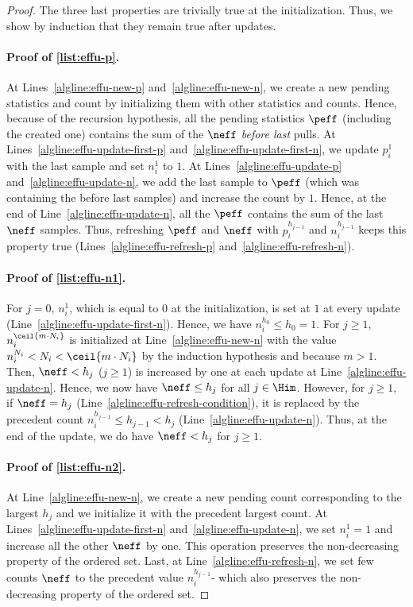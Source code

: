 \begin{proof}
The three last properties are trivially true at the initialization. Thus, we show by induction that they remain true after updates.
\paragraph{Proof of \ref{list:effu-p}. } At Lines~\ref{algline:effu-new-p} and~\ref{algline:effu-new-n}, we create a new pending statistics and count by initializing them with other statistics and counts. Hence, because of the recursion hypothesis, all the pending statistics $\peff$ (including the created one) contains the sum of the $\neff$ \emph{before last} pulls. At Lines~\ref{algline:effu-update-first-p} and~\ref{algline:effu-update-first-n}, we update $p_i^1$ with the last sample and set $n_i^1$ to $1$. At Lines~\ref{algline:effu-update-p} and~\ref{algline:effu-update-n}, we add the last sample to $\peff$ (which was containing the before last samples) and increase the count by $1$. Hence, at the end of Line~\ref{algline:effu-update-n}, all the $\peff$ contains the sum of the last $\neff$ samples. Thus, refreshing $\peff$ and $\neff$ with $ p_i^{h_{j-1}}$ and $n_i^{h_{j-1}}$ keeps this property true (Lines~\ref{algline:effu-refresh-p} and~\ref{algline:effu-refresh-n}). 

\paragraph{Proof of \ref{list:effu-n1}.}
For $j=0$, $n_i^1$, which is equal to $0$ at the initialization, is set at $1$ at every update (Line~\ref{algline:effu-update-first-n}). Hence, we have $n_i^{h_0} \leq h_0=1$.
For $j\geq 1$, $n_i^{\ceil{m \cdot N_i}}$ is initialized at Line~\ref{algline:effu-new-n} with the value $n_i^{N_i} < N_i < \ceil{m \cdot N_i}$ by the induction hypothesis and because $m>1$.  Then, $\neff < h_j$ ($j\geq1$) is increased by one at each update at Line~\ref{algline:effu-update-n}. Hence, we now have $\neff \leq  h_j$ for all $j\in\Him$. However, for $j\geq 1$, if $\neff = h_j$ (Line~\ref{algline:effu-refresh-condition}), it is replaced by the precedent count $n_i^{h_{j-1}}\leq h_{j-1} < h_j$ (Line~\ref{algline:effu-update-n}). Thus, at the end of the update, we do have $\neff < h_j$ for $j\geq1$.

\paragraph{Proof of \ref{list:effu-n2}.}
At Line~\ref{algline:effu-new-n}, we create a new pending count corresponding to the largest $h_j$ and we initialize it with the precedent largest count. At Lines~\ref{algline:effu-update-first-n} and~\ref{algline:effu-update-n}, we set $n_i^1 =1$ and increase all the other $\neff$ by one. This operation preserves the non-decreasing property of the ordered set. Last, at Line~\ref{algline:effu-refresh-n}, we set few counts $\neff$ to the precedent value $n_i^{h_{j-1}}$- which also preserves the non-decreasing property of the ordered set. 


\end{proof}
